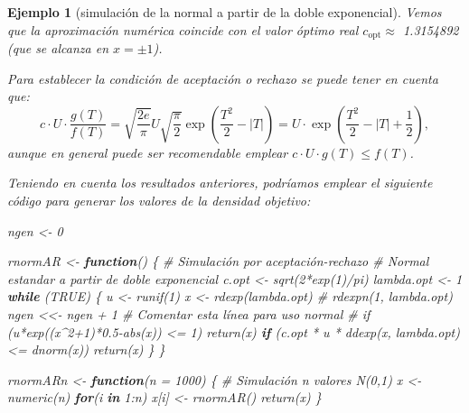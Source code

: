 \documentclass[
]{book}
\newenvironment{Shaded}{\begin{snugshade}}{\end{snugshade}}
\newcommand{\AttributeTok}[1]{\textcolor[rgb]{0.77,0.63,0.00}{#1}}
\newcommand{\CommentTok}[1]{\textcolor[rgb]{0.56,0.35,0.01}{\textit{#1}}}
\newcommand{\ConstantTok}[1]{\textcolor[rgb]{0.00,0.00,0.00}{#1}}
\newcommand{\ControlFlowTok}[1]{\textcolor[rgb]{0.13,0.29,0.53}{\textbf{#1}}}
\newcommand{\DecValTok}[1]{\textcolor[rgb]{0.00,0.00,0.81}{#1}}
\newcommand{\FunctionTok}[1]{\textcolor[rgb]{0.00,0.00,0.00}{#1}}
\newcommand{\NormalTok}[1]{#1}
\newcommand{\OtherTok}[1]{\textcolor[rgb]{0.56,0.35,0.01}{#1}}
\newcommand{\SpecialCharTok}[1]{\textcolor[rgb]{0.00,0.00,0.00}{#1}}
\theoremstyle{break}
\newtheorem{example}{Ejemplo}[chapter]
\theoremstyle{nonumberplain}
\begin{document}
\begin{example}[simulación de la normal a partir de la doble exponencial]
Vemos que la aproximación numérica coincide con el valor óptimo real \(c_{\text{opt}} \approx\) 1.3154892 (que se alcanza en \(x = \pm 1\)).

Para establecer la condición de aceptación o rechazo se puede tener en cuenta que:
\[c\cdot U\cdot\frac{g\left( T\right)  }{f\left( T\right)  }=\sqrt{\frac
{2e}{\pi}}U\sqrt{\frac{\pi}{2}}\exp\left( \frac{T^{2}}{2}-\left\vert
T\right\vert \right)  =U\cdot\exp\left( \frac{T^{2}}{2}-\left\vert
T\right\vert +\frac{1}{2}\right),\]
aunque en general puede ser recomendable emplear
\(c\cdot U\cdot g\left( T\right) \leq f\left( T\right)\).

Teniendo en cuenta los resultados anteriores, podríamos emplear el siguiente código para generar los valores de la densidad objetivo:

\begin{Shaded}
\begin{Highlighting}[]
\NormalTok{ngen }\OtherTok{\textless{}{-}} \DecValTok{0}

\NormalTok{rnormAR }\OtherTok{\textless{}{-}} \ControlFlowTok{function}\NormalTok{() \{}
\CommentTok{\# Simulación por aceptación{-}rechazo}
\CommentTok{\# Normal estandar a partir de doble exponencial}
\NormalTok{  c.opt }\OtherTok{\textless{}{-}} \FunctionTok{sqrt}\NormalTok{(}\DecValTok{2}\SpecialCharTok{*}\FunctionTok{exp}\NormalTok{(}\DecValTok{1}\NormalTok{)}\SpecialCharTok{/}\NormalTok{pi)}
\NormalTok{  lambda.opt }\OtherTok{\textless{}{-}} \DecValTok{1}
  \ControlFlowTok{while}\NormalTok{ (}\ConstantTok{TRUE}\NormalTok{) \{}
\NormalTok{    u }\OtherTok{\textless{}{-}} \FunctionTok{runif}\NormalTok{(}\DecValTok{1}\NormalTok{)}
\NormalTok{    x }\OtherTok{\textless{}{-}} \FunctionTok{rdexp}\NormalTok{(lambda.opt) }\CommentTok{\# rdexpn(1, lambda.opt)}
\NormalTok{    ngen }\OtherTok{\textless{}\textless{}{-}}\NormalTok{ ngen }\SpecialCharTok{+} \DecValTok{1} \CommentTok{\# Comentar esta línea para uso normal}
    \CommentTok{\# if (u*exp((x\^{}2+1)*0.5{-}abs(x)) \textless{}= 1) return(x)}
    \ControlFlowTok{if}\NormalTok{ (c.opt }\SpecialCharTok{*}\NormalTok{ u }\SpecialCharTok{*} \FunctionTok{ddexp}\NormalTok{(x, lambda.opt) }\SpecialCharTok{\textless{}=} \FunctionTok{dnorm}\NormalTok{(x)) }\FunctionTok{return}\NormalTok{(x)}
\NormalTok{  \}}
\NormalTok{\}}

\NormalTok{rnormARn }\OtherTok{\textless{}{-}} \ControlFlowTok{function}\NormalTok{(}\AttributeTok{n =} \DecValTok{1000}\NormalTok{) \{}
\CommentTok{\# Simulación n valores N(0,1)}
\NormalTok{    x }\OtherTok{\textless{}{-}} \FunctionTok{numeric}\NormalTok{(n)}
    \ControlFlowTok{for}\NormalTok{(i }\ControlFlowTok{in} \DecValTok{1}\SpecialCharTok{:}\NormalTok{n) x[i] }\OtherTok{\textless{}{-}} \FunctionTok{rnormAR}\NormalTok{()}
    \FunctionTok{return}\NormalTok{(x)}
\NormalTok{\}}
\end{Highlighting}
\end{Shaded}


\end{example}
\end{document}

